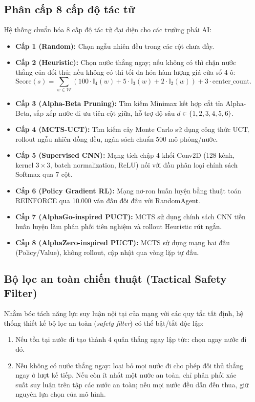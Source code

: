 \documentclass[11pt, a4paper]{article}
\begin{document}
\subsection{Phân cấp 8 cấp độ tác tử}
Hệ thống chuẩn hóa 8 cấp độ tác tử đại diện cho các trường phái AI:
\begin{itemize}
    \item \textbf{Cấp 1 (Random):} Chọn ngẫu nhiên đều trong các cột chưa đầy.
    \item \textbf{Cấp 2 (Heuristic):} Chọn nước thắng ngay; nếu không có thì chặn nước thắng của đối thủ; nếu không có thì tối đa hóa hàm lượng giá cửa sổ 4 ô:
    \begin{equation}
    \text{Score}(s) = \sum_{w \in \mathcal{W}} \left( 100 \cdot \mathbb{I}_{4}(w) + 5 \cdot \mathbb{I}_{3}(w) + 2 \cdot \mathbb{I}_{2}(w) \right) + 3 \cdot \text{center\_count}.
    \end{equation}
    \item \textbf{Cấp 3 (Alpha-Beta Pruning):} Tìm kiếm Minimax kết hợp cắt tỉa Alpha-Beta, sắp xếp nước đi ưu tiên cột giữa, hỗ trợ độ sâu $d \in \{1, 2, 3, 4, 5, 6\}$.
    \item \textbf{Cấp 4 (MCTS-UCT):} Tìm kiếm cây Monte Carlo sử dụng công thức UCT, rollout ngẫu nhiên đồng đều, ngân sách chuẩn 500 mô phỏng/nước.
    \item \textbf{Cấp 5 (Supervised CNN):} Mạng tích chập 4 khối Conv2D (128 kênh, kernel $3 \times 3$, batch normalization, ReLU) nối với đầu phân loại chính sách Softmax qua 7 cột.
    \item \textbf{Cấp 6 (Policy Gradient RL):} Mạng nơ-ron huấn luyện bằng thuật toán REINFORCE qua 10.000 ván đấu đối đầu với RandomAgent.
    \item \textbf{Cấp 7 (AlphaGo-inspired PUCT):} MCTS sử dụng chính sách CNN tiền huấn luyện làm phân phối tiên nghiệm và rollout Heuristic rút ngắn.
    \item \textbf{Cấp 8 (AlphaZero-inspired PUCT):} MCTS sử dụng mạng hai đầu (Policy/Value), không rollout, cập nhật qua vòng lặp tự đấu.
\end{itemize}

\subsection{Bộ lọc an toàn chiến thuật (Tactical Safety Filter)}
Nhằm bóc tách năng lực suy luận nội tại của mạng với các quy tắc tất định, hệ thống thiết kế bộ lọc an toàn (\textit{safety filter}) có thể bật/tắt độc lập:
\begin{enumerate}
    \item Nếu tồn tại nước đi tạo thành 4 quân thắng ngay lập tức: chọn ngay nước đi đó.
    \item Nếu không có nước thắng ngay: loại bỏ mọi nước đi cho phép đối thủ thắng ngay ở lượt kế tiếp. Nếu còn ít nhất một nước an toàn, chỉ phân phối xác suất suy luận trên tập các nước an toàn; nếu mọi nước đều dẫn đến thua, giữ nguyên lựa chọn của mô hình.
\end{enumerate}
\end{document}
